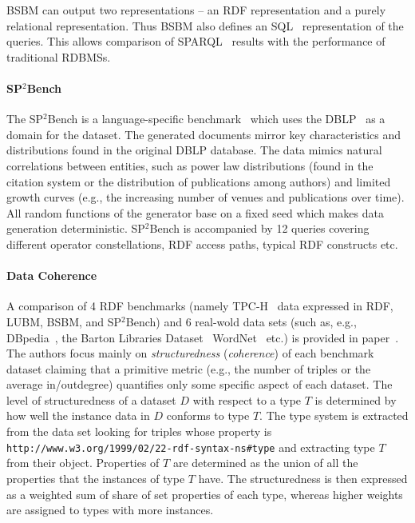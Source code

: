 BSBM can output two representations -- an RDF representation and a purely relational representation. Thus BSBM also defines an SQL~\cite{sql} representation of the queries. This allows comparison of SPARQL~\cite{sparql} results with the performance of traditional RDBMSs.


\paragraph{SP$^2$Bench} The SP$^2$Bench is a language-specific benchmark~\cite{Schmidt2010} which uses the DBLP~\cite{dblp} as a domain for the dataset. %
The generated documents mirror key characteristics and distributions found in the original DBLP database. The data mimics natural correlations between entities, such as power law distributions (found in the citation system or the distribution of publications among authors) and limited growth curves (e.g., the increasing number of venues and publications over time). All random functions of the generator base on a fixed seed which makes data generation deterministic. SP$^2$Bench is accompanied by 12 queries covering different operator constellations, RDF access paths, typical RDF constructs etc.


\paragraph{Data Coherence}  A comparison of 4 RDF benchmarks (namely TPC-H~\cite{TPC-H} data expressed in RDF, LUBM, BSBM, and SP$^2$Bench) and 6 real-wold data sets (such as, e.g.,  DBpedia~\cite{Bizer:2009:DCP:1640541.1640848}, the Barton Libraries Dataset~\cite{barton-benchmark}
WordNet~\cite{Miller:1995:WLD:219717.219748} etc.) is provided in paper~\cite{Duan:2011:AOC:1989323.1989340}. The authors focus mainly on \emph{structuredness} (\emph{coherence}) of each benchmark dataset claiming that a primitive metric (e.g., the number of triples or the average in/outdegree) quantifies only some specific aspect of each dataset. The level of structuredness of a dataset $D$ with respect to a type $T$ is determined by how well the instance data in $D$ conforms to type $T$. The type system is extracted from the data set looking for triples whose property is \texttt{http://www.w3.org/1999/02/22-rdf-syntax-ns\#type} and extracting type $T$ from their object. Properties of $T$ are determined as the union of all the properties that the instances of type $T$ have. The structuredness is then expressed as a weighted sum of share of set properties of each type, whereas higher weights are assigned to types with more instances.


